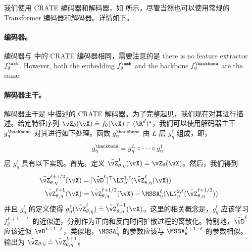 \documentclass[../../book-main_zh.tex]{subfiles}
\begin{document}
我们使用 CRATE 编码器和解码器，如  所示，尽管当然也可以使用常规的 Transformer 编码器和解码器。详情如下。

\paragraph{编码器。} 编码器与  中的 CRATE 编码器相同，需要注意的是
there is no feature extractor \(f_{\theta}^{\ext}\). However, both
the embedding \(f_{\theta}^{\emb}\) and the backbone
\(f_{\theta}^{\backbone}\) are the same.

\paragraph{解码器主干。} 解码器主干是  中描述的 CRATE 解码器。为了完整起见，我们现在对其进行描述。给定特征序列 \(\vZ_{\theta}(\vX) \doteq
f_{\theta}(\vX) \in (\R^{d})^{*}\)，我们可以使用解码器主干 \(g_{\eta}^{\backbone}\) 对其进行如下处理。函数 \(g_{\eta}^{\backbone}\) 由 \(L\) 层 \(g_{\eta}^{\ell}\) 组成，即，
\begin{equation}
g_{\eta}^{\backbone} = g_{\eta}^{L} \circ \cdots \circ g_{\eta}^{1}.
\end{equation}
层 \(g_{\eta}^{\ell}\) 具有以下实现。首先，定义 \(\tilde{\vZ}_{\theta, \eta}^{1}(\vX) \doteq
\vZ_{\theta}(\vX)\)。然后，我们得到
\begin{align}
\tilde{\vZ}_{\theta, \eta}^{\ell + 1/2}(\vX)
&= [\tilde{\vD}^{\ell}]^{\top}\LN_{\eta}^{1,
\ell}(\tilde{\vZ}_{\theta, \eta}^{\ell}(\vX)) \\
\tilde{\vZ}_{\theta, \eta}^{\ell + 1}(\vX)
&= \tilde{\vZ}_{\theta, \eta}^{\ell + 1/2}(\vX) -
\MSSA_{\eta}^{\ell}(\LN_{\eta}^{2, \ell}(\tilde{\vZ}_{\theta,
\eta}^{\ell + 1/2}))
\end{align}
并且 \(g_{\eta}^{\ell}\) 的定义使得 \(g_{\eta}^{\ell}(\tilde{\vZ}_{\theta, \eta}^{\ell}) \doteq
\tilde{\vZ}_{\theta, \eta}^{\ell + 1}(\vX)\)。这里的相关概念是，\(g_{\eta}^{\ell}\) 应该学习 \(f_{\theta}^{L + 1 - \ell}\) 的近似逆，分别作为正向和反向时间扩散过程的离散化。特别地，\(\tilde{\vD}^{\ell}\) 应该近似 \(\vD^{L + 1 -
\ell}\)，类似地，\(\MSSA_{\eta}^{\ell}\) 的参数应该与 \(\MSSA_{\theta}^{L + 1 - \ell}\) 的参数相似。输出为 \(\tilde{\vZ}_{\theta, \eta} \doteq
\tilde{\vZ}_{\theta, \eta}^{L + 1}\)。
\end{document}
